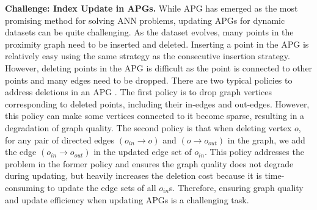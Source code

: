 \textbf{Challenge: Index Update in APGs.}
While APG has emerged as the most promising method for solving ANN problems, updating APGs for dynamic datasets can be quite challenging. As the dataset evolves, many points in the proximity graph need to be inserted and deleted. Inserting a point in the APG is relatively easy using the same strategy as the consecutive insertion strategy. However, deleting points in the APG is difficult as the point is connected to other points and many edges need to be dropped. There are two typical policies to address deletions in an APG \cite{DBLP:journals/corr/abs-2105-09613}. The first policy is to drop graph vertices corresponding to deleted points, including their in-edges and out-edges. However, this policy can make some vertices connected to it become sparse, resulting in a degradation of graph quality. The second policy is that when deleting vertex $o$, for any pair of directed edges $(o_{in}\to o)$ and $(o\to o_{out})$ in the graph, we add the edge $(o_{in}\to o_{out})$ in the updated edge set of $o_{in}$. This policy addresses the problem in the former policy and ensures the graph quality does not degrade during updating, but heavily increases the deletion cost because it is time-consuming to update the edge sets of all $o_{in}$s. Therefore, ensuring graph quality and update efficiency when updating APGs is a challenging task.

